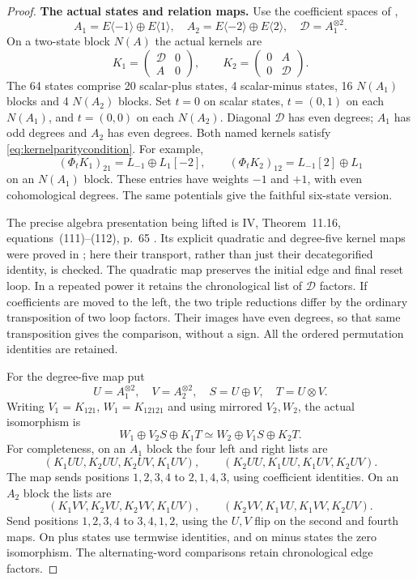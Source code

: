 \begin{proof}
\par\smallskip\noindent\textbf{The actual states and relation maps.}\quad
Use the coefficient spaces of ,
\[
 A_1=E\langle-1\rangle\oplus E\langle1\rangle,\quad
 A_2=E\langle-2\rangle\oplus E\langle2\rangle,\quad
 \mathcal D=A_1^{\otimes2}.
\]
On a two-state block \(N(A)\) the actual kernels are
\[
 K_1=\begin{pmatrix}\mathcal D&0\\A&0\end{pmatrix},
 \qquad
 K_2=\begin{pmatrix}0&A\\0&\mathcal D\end{pmatrix}.
\]
The 64 states comprise 20 scalar-plus states, 4
scalar-minus states, 16 \(N(A_1)\) blocks and 4
\(N(A_2)\) blocks. Set \(t=0\) on scalar states,
\(t=(0,1)\) on each \(N(A_1)\), and \(t=(0,0)\)
on each \(N(A_2)\). Diagonal \(\mathcal D\) has
even degrees; \(A_1\) has odd degrees and \(A_2\)
has even degrees. Both named kernels satisfy
\eqref{eq:kernelparitycondition}.
For example,
\[
 (\Phi_tK_1)_{21}=L_{-1}\oplus L_1[-2],
 \qquad
 (\Phi_tK_2)_{12}=L_{-1}[2]\oplus L_1
\]
on an \(N(A_1)\) block. These entries have weights
\(-1\) and \(+1\), with even cohomological degrees.
The same potentials give the faithful six-state version.

The precise algebra presentation being lifted is IV,
Theorem~11.16, equations~(111)--(112), p.~65
\cite{IV}. Its explicit quadratic and degree-five kernel
maps were proved in ; here their transport,
rather than just their decategorified identity, is checked.
The quadratic map preserves the initial edge and final
reset loop. In a repeated power it retains the
chronological list of \(\mathcal D\) factors.
If coefficients are moved to the left, the two triple
reductions differ by the ordinary transposition of two
loop factors. Their images have even degrees, so that
same transposition gives the comparison, without a sign.
All the ordered permutation identities are retained.

For the degree-five map put
\[
 U=A_1^{\otimes2},\quad V=A_2^{\otimes2},\quad
 S=U\oplus V,\quad T=U\otimes V.
\]
Writing \(V_1=K_{121}\), \(W_1=K_{12121}\) and
using mirrored \(V_2,W_2\), the actual isomorphism is
\begin{equation}\label{eq:puredegreefivemap}
 W_1\oplus V_2S\oplus K_1T
       \simeq W_2\oplus V_1S\oplus K_2T.
\end{equation}
For completeness, on an \(A_1\) block the four left and
right lists are
\[
 (K_1UU,K_2UU,K_2UV,K_1UV),\qquad
 (K_2UU,K_1UU,K_1UV,K_2UV).
\]
The map sends positions \(1,2,3,4\) to \(2,1,4,3\),
using coefficient identities. On an \(A_2\) block the
lists are
\[
 (K_1VV,K_2VU,K_2VV,K_1UV),\qquad
 (K_2VV,K_1VU,K_1VV,K_2UV).
\]
Send positions \(1,2,3,4\) to \(3,4,1,2\), using the
\(U,V\) flip on the second and fourth maps.
On plus states use termwise identities, and on minus
states the zero isomorphism.
The alternating-word comparisons retain chronological
edge factors.


\end{proof}
